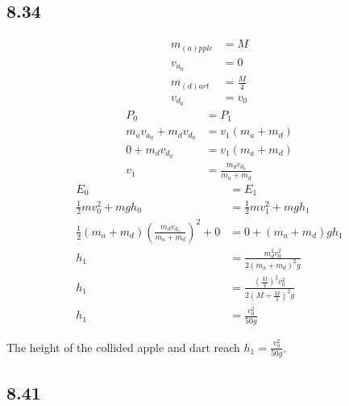 \documentclass{article}
\begin{document}
\subsection{8.34}

\begin{align*}
	m_{(a)pple} & = M \\
	v_{a_0} & = 0 \\
	m_{(d)art} & = \frac{M}{4} \\
	v_{d_0} & = v_0
\end{align*}
\begin{align*}
	P_0 & = P_1 \\
	m_av_{a_0} + m_dv_{d_0} & = v_1(m_a + m_d) \\
	0 + m_dv_{d_0} & = v_1(m_a + m_d) \\
	v_1 & = \frac{m_dv_{d_0}}{m_a + m_d}
\end{align*}
\begin{align*}
	E_0 & = E_1 \\
	\frac{1}{2}mv_0^2 + mgh_0 & = \frac{1}{2}mv_1^2 + mgh_1 \\
	\frac{1}{2}(m_a + m_d)\left( \frac{m_dv_{d_0}}{m_a + m_d} \right)^2 + 0 & = 0 + (m_a + m_d)gh_1 \\
	h_1 & = \frac{m_d^2v_0^2}{2(m_a + m_d)^2g} \\
	h_1 & = \frac{ \left( \frac{M}{4} \right)^2 v_0^2}{2 \left( M + \frac{M}{4} \right)^2 g} \\
	h_1 & = \frac{v_0^2}{50g}
\end{align*}
\begin{mdframed}
	The height of the collided apple and dart reach $ h_1 = \frac{v_0^2}{50g} $.
\end{mdframed}

\subsection{8.41}
\end{document}
